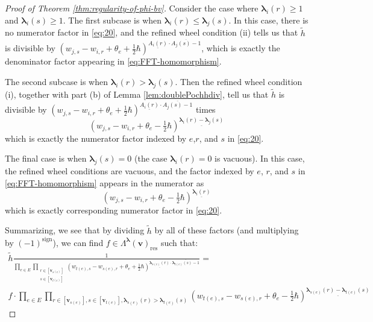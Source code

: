 \documentclass[11pt,reqno]{amsart}
\renewcommand{\mathbf}{\mathbold}
\numberwithin{equation}{section}
\theoremstyle{definition}
\newcommand{\bv}{\mathbf{v}}
\renewcommand{\tilde}[1]{\widetilde{#1}}
\renewcommand{\bv}{\mathbf{v}} %
\newcommand{\GT}{\Lambda}
\newcommand{\bla}{{\boldsymbol{\lambda}}}
\newcommand{\res}{\mathrm{res}}
\begin{document}
\begin{proof}[Proof of Theorem \ref{thm:regularity-of-phi-bv}]
Consider the case where $\bla_i(r) \geq 1$ and $\bla_i(s) \geq 1$. The first subcase is when $\bla_i(r) \leq \bla_j(s)$. In this case, there is no numerator factor in \eqref{eq:20}, and the refined wheel condition (ii) tells us that $\tilde{h}$ is divisible by $
(w_{j,s} - w_{i,r} + \theta_e + \frac{1}{2}\hbar)^{\underline{A_i(r)} \cdot \overline{A_j(s) - 1}}$, which is exactly the denominator factor appearing in \eqref{eq:FFT-homomorphism}.

The second subcase is when $\bla_i(r) > \bla_j(s)$. Then the refined wheel condition (i), together with part (b) of Lemma \ref{lem:doublePochhdiv}, tell us that $\tilde{h}$ is divisible by $(w_{j,s} - w_{i,r} + \theta_e + \frac{1}{2}\hbar)^{\underline{A_i(r)} \cdot \overline{A_j(s) - 1}}$ times
\begin{equation}
  \label{eq:25}
  (w_{j,s} - w_{i,r} + \theta_e - \tfrac{1}{2} \hbar)^{\underline{\bla_{i}(r) - \bla_{j}(s)}}
\end{equation}
which is exactly the numerator factor indexed by $e$,$r$, and $s$ in \eqref{eq:20}.

The final case is when $\bla_j(s) = 0$ (the case $\bla_i(r) = 0$ is vacuous). In this case, the refined wheel conditions are vacuous, and the factor indexed by $e$, $r$, and $s$ in \eqref{eq:FFT-homomorphism} appears in the numerator as
\begin{equation}
  \label{eq:26}
(w_{j,s} - w_{i,r} + \theta_e - \tfrac{1}{2} \hbar)^{\underline{\bla_{i}(r) }}  
\end{equation}
which is exactly corresponding numerator factor in \eqref{eq:20}.


Summarizing, we see that by dividing $\tilde{h}$ by all of these factors (and multiplying by $(-1)^{\mathrm{sign}}$), we can find $f \in \GT^{\bla}(\bv)_{\res}$ such that:
\begin{align*}
  \tilde{h} \frac{1}{\prod_{e \in E} \prod_{\substack{r \in [\bv_{s(e)}] \\ s \in [\bv_{t(e)}]}} (w_{t(e),s} - w_{s(e),r} + \theta_e + \frac{1}{2} \hbar)^{\underline{\bla_{s(e)}(r)}\cdot \overline{\bla_{t(e)}(s)-1}}}  = \\ f \cdot  \prod_{e \in E} \prod_{r \in [\bv_{s(e)}],s \in [\bv_{t(e)}], \bla_{s(e)}(r) > \bla_{t(e)}(s)} (w_{t(e),s} - w_{s(e),r} + \theta_e - \tfrac{1}{2} \hbar)^{\underline{\bla_{s(e)}(r) - \bla_{t(e)}(s)}} 
\end{align*}


\end{proof}
\end{document}
